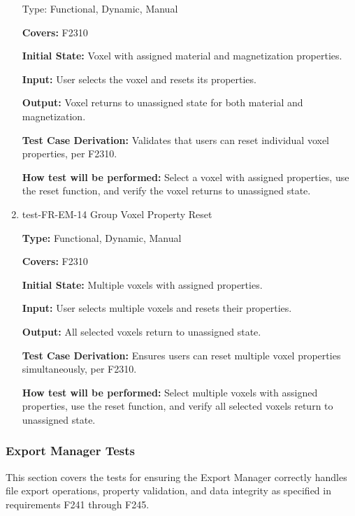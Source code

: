 \documentclass[12pt, titlepage]{article}
\begin{document}
\begin{enumerate}
Type: Functional, Dynamic, Manual

\textbf{Covers:} F2310
					
\textbf{Initial State:} Voxel with assigned material and magnetization properties.
					
\textbf{Input:} User selects the voxel and resets its properties.
					
\textbf{Output:} Voxel returns to unassigned state for both material and magnetization.

\textbf{Test Case Derivation:} Validates that users can reset individual voxel properties, per F2310.
					
\textbf{How test will be performed:} Select a voxel with assigned properties, use the reset function, and verify the voxel returns to unassigned state.

\item{test-FR-EM-14 Group Voxel Property Reset\\}

\textbf{Type:} Functional, Dynamic, Manual

\textbf{Covers:} F2310
					
\textbf{Initial State:} Multiple voxels with assigned properties.
					
\textbf{Input:} User selects multiple voxels and resets their properties.
					
\textbf{Output:} All selected voxels return to unassigned state.

\textbf{Test Case Derivation:} Ensures users can reset multiple voxel properties simultaneously, per F2310.
					
\textbf{How test will be performed:} Select multiple voxels with assigned properties, use the reset function, and verify all selected voxels return to unassigned state.


\end{enumerate}


\subsubsection{Export Manager Tests}

This section covers the tests for ensuring the Export Manager correctly
handles file export operations, property validation, and data integrity
as specified in requirements F241 through F245.
\end{document}

